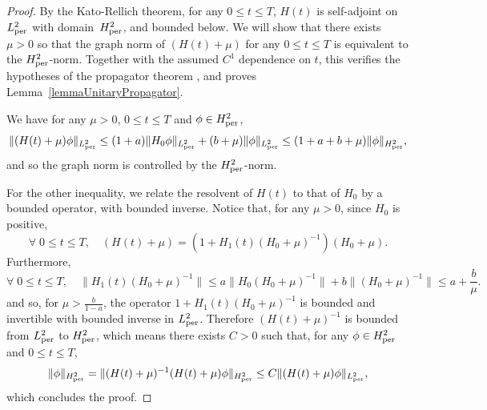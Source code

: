 \documentclass[a4paper,11pt]{article}
\theoremstyle{plain}
\theoremstyle{remark}
\begin{document}
\begin{proof}By the Kato-Rellich theorem, for any $0\leq t\leq T$,
  $H(t)$ is self-adjoint on $L^2_{\rm per}$ with domain~$H_{\rm per}^{2}$, and
  bounded below. We will show that there exists $\mu>0$ so that the
  graph norm of $(H(t)+\mu)$ for any $0\leq t \leq T$ is equivalent to
  the $H_{\rm per}^{2}$-norm. Together with the assumed $C^1$ dependence
  on $t$, this verifies the hypotheses of the propagator theorem
  \cite[Theorem X.70]{ReedSimon2}, and proves
  Lemma~\ref{lemmaUnitaryPropagator}.

\medskip

We have for any $\mu>0$, $0\leq t\leq T$ and $\phi \in H_{\rm per}^{2}$,
\[ \|(H(t)+\mu)\phi \|_{L^{2}_{\rm per}} \leq (1+a)\|H_{0} \phi \|_{L^{2}_{\rm per}} + (b+\mu) \|\phi\|_{L^{2}_{\rm per}} \leq (1+a+b+\mu) \|\phi\|_{H_{\rm per}^{2}},\]
and so the graph norm is controlled by the $H_{\rm per}^{2}$-norm.

\medskip

For the other inequality, we relate the resolvent of $H(t)$ to that of $H_{0}$ by a bounded operator, with bounded inverse.
Notice that, for any $\mu>0$, since $H_{0}$ is positive,
\[\forall \; 0\leq t\leq T, \quad (H(t)+\mu) = (1+H_{1}(t)(H_{0}+\mu)^{-1})(H_{0}+\mu).\]
Furthermore,
\[\forall \; 0\leq t\leq T, \quad\|H_{1}(t)(H_{0}+\mu)^{-1}\| \leq
  a\|H_{0}(H_{0}+\mu)^{-1}\| +b\|(H_{0}+\mu)^{-1}\| \leq a
  +\frac{b}{\mu}.\]
and so, for $\mu > \frac{b}{1-a}$, the operator
$1+ H_{1}(t)(H_{0}+\mu)^{-1}$ is bounded and invertible with bounded
inverse in $L^{2}_{\rm per}$. Therefore $(H(t)+\mu)^{-1}$ is bounded
from $L^2_{\rm per}$ to $H_{\rm per}^{2}$, which means there exists $C>0$ such
that, for any $\phi \in H_{\rm per}^{2}$ and $0\leq t\leq T$,
\[  \|\phi\|_{H_{\rm per}^{2}} = \|(H(t)+\mu)^{-1}(H(t)+\mu)\phi\|_{H_{\rm per}^{2}} \leq C\|(H(t)+\mu)\phi\|_{L^{2}_{\rm per}}, \]
which concludes the proof.
\end{proof}




\end{document}
